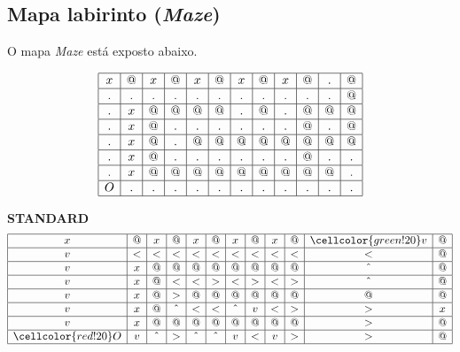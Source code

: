 \documentclass{article}
\begin{document}
\subsection{Mapa labirinto (\textit{Maze})}

O mapa \textit{Maze} está exposto abaixo.

\[
	\begin{array}{|c|c|c|c|c|c|c|c|c|c|c|c|}
		\hline
		x & @ & x & @ & x & @ & x & @ & x & @ & . & @ \\ \hline
		. & . & . & . & . & . & . & . & . & . & . & @ \\ \hline
		. & x & @ & @ & @ & @ & . & @ & . & @ & @ & @ \\ \hline
		. & x & @ & . & . & . & . & . & . & @ & . & @ \\ \hline
		. & x & @ & . & @ & @ & @ & @ & @ & @ & @ & @ \\ \hline
		. & x & @ & . & . & . & . & . & . & @ & . & . \\ \hline
		. & x & @ & @ & @ & @ & @ & @ & @ & @ & @ & . \\ \hline
		O & . & . & . & . & . & . & . & . & . & . & . \\ \hline
	\end{array}
\]

\vspace{10pt}


\begin{center}
	\small \textbf{STANDARD}
	\[
		\begin{array}{|c|c|c|c|c|c|c|c|c|c|c|c|}
			\hline
			x                   & @ & x      & @      & x      & @      & x      & @ & x & @ & \cellcolor{green!20}v & @ \\ \hline
			v                   & < & <      & <      & <      & <      & <      & < & < & < & <                     & @ \\ \hline
			v                   & x & @      & @      & @      & @      & @      & @ & @ & @ & \hat{}                & @ \\ \hline
			v                   & x & @      & <      & <      & >      & <      & > & < & > & \hat{}                & @ \\ \hline
			v                   & x & @      & >      & @      & @      & @      & @ & @ & @ & @                     & @ \\ \hline
			v                   & x & @      & \hat{} & <      & <      & \hat{} & v & < & > & >                     & x \\ \hline
			v                   & x & @      & @      & @      & @      & @      & @ & @ & @ & >                     & @ \\ \hline
			\cellcolor{red!20}O & v & \hat{} & >      & \hat{} & \hat{} & v      & < & v & > & >                     & @ \\ \hline
		\end{array}
	\]
\end{center}
\end{document}
